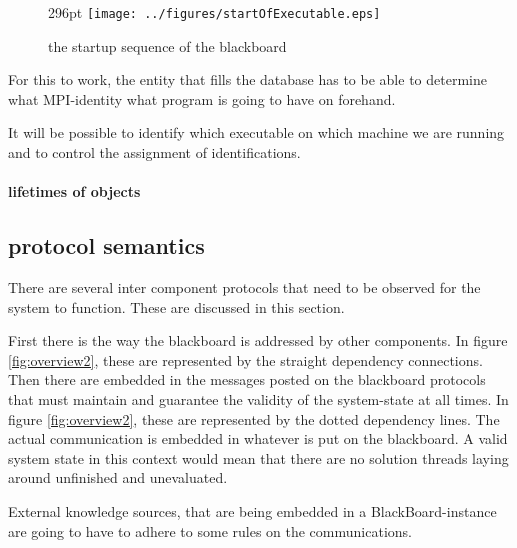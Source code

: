 \documentclass[]{lofar}
\begin{document}
        \begin{figure}{296pt}
          \texttt{[image: ../figures/startOfExecutable.eps]}
          \hypertarget{fig:startOfExecutable}{}
          \caption{the startup sequence of the blackboard{\label{fig:startOfExecutable}}}
        \end{figure}

        For this to work, the entity that fills the database has to be
        able to determine what MPI-identity what program is going to
        have on forehand.

        \begin{assumption}
          It will be possible to identify which executable on which
          machine we are running and to control the assignment of
          identifications.
          \caption{identification of executables\label{ass:ident}}
        \end{assumption}

        \paragraph{lifetimes of objects}

    \subsection{protocol semantics}

      There are several inter component protocols that need to be
      observed for the system to function. These are discussed in this
      section.

      First there is the way the blackboard is addressed by other
      components. In figure
      \hyperlink{fig:overview2}{\ref{fig:overview2}}, these are
      represented by the straight dependency connections. Then there
      are embedded in the messages posted on the blackboard protocols
      that must maintain and guarantee the validity of the
      system-state at all times. In figure
      \hyperlink{fig:overview2}{\ref{fig:overview2}}, these are
      represented by the dotted dependency lines. The actual
      communication is embedded in whatever is put on the
      blackboard. A valid system state in this context would mean that
      there are no solution threads laying around unfinished and
      unevaluated.

      External knowledge sources, that are being embedded in a
      BlackBoard-instance are going to have to adhere to some rules on
      the communications.
\end{document}
